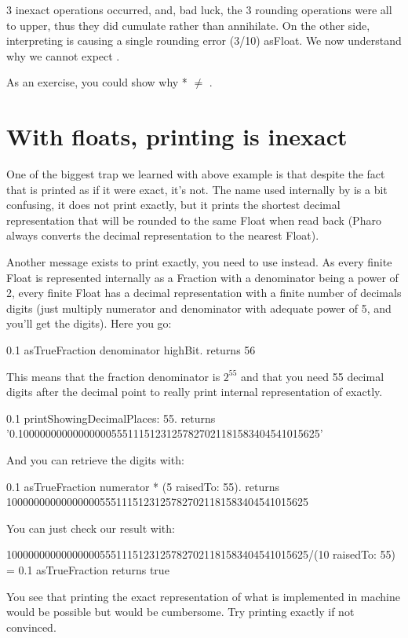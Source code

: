 \documentclass[a4paper,10pt,twoside]{book}
\begin{document}
3 inexact operations occurred, and, bad luck, the 3 rounding operations were all to upper, thus they did cumulate rather than annihilate.
On the other side, interpreting  is causing a single rounding error (3/10) asFloat.
We now understand why we cannot expect .

As an exercise, you could show why  *   $\neq$ .


\section{With floats, printing is inexact}

One of the biggest trap we learned with above example is that despite the fact that  is printed  as if it were exact, it's not.
The name  used internally by  is a bit confusing, it does not print exactly,
but it prints the shortest decimal representation that will be rounded
to the same Float when read back (Pharo always converts the decimal representation to the nearest Float).

Another message exists to print exactly, you need to use  instead.
As every finite Float is  represented internally as a Fraction with a
denominator being a power of 2, every finite Float has a decimal
representation with a finite number of decimals digits (just multiply
numerator and denominator with adequate power of 5, and you'll get the
digits). Here you go:
\begin{code}{}
0.1 asTrueFraction denominator highBit.
	returns  56
\end{code}
This means that the fraction denominator is $2^{55}$ and that you need 55 decimal digits after the decimal point to really print internal representation of  exactly.
\begin{code}{}
0.1 printShowingDecimalPlaces: 55.
	returns '0.1000000000000000055511151231257827021181583404541015625'
\end{code}
And you can retrieve the digits with:
\begin{code}{}
0.1 asTrueFraction numerator * (5 raisedTo: 55).
	returns  1000000000000000055511151231257827021181583404541015625
\end{code}
You can just check our result with:
\begin{code}{}
1000000000000000055511151231257827021181583404541015625/(10 raisedTo: 55) =  0.1 asTrueFraction
	returns true
\end{code}
You see that printing the exact representation of what is implemented in machine would be possible but would be cumbersome. Try printing  exactly if not convinced.
\end{document}
